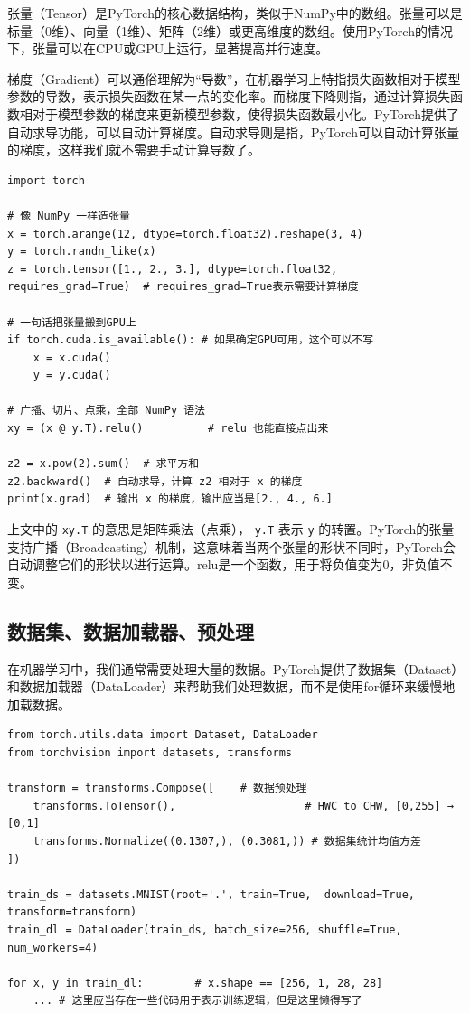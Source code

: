 张量（Tensor）是PyTorch的核心数据结构，类似于NumPy中的数组。张量可以是标量（0维）、向量（1维）、矩阵（2维）或更高维度的数组。使用PyTorch的情况下，张量可以在CPU或GPU上运行，显著提高并行速度。

梯度（Gradient）可以通俗理解为“导数”，在机器学习上特指损失函数相对于模型参数的导数，表示损失函数在某一点的变化率。而梯度下降则指，通过计算损失函数相对于模型参数的梯度来更新模型参数，使得损失函数最小化。PyTorch提供了自动求导功能，可以自动计算梯度。自动求导则是指，PyTorch可以自动计算张量的梯度，这样我们就不需要手动计算导数了。

\begin{verbatim}
import torch

# 像 NumPy 一样造张量
x = torch.arange(12, dtype=torch.float32).reshape(3, 4)
y = torch.randn_like(x)
z = torch.tensor([1., 2., 3.], dtype=torch.float32, requires_grad=True)  # requires_grad=True表示需要计算梯度

# 一句话把张量搬到GPU上
if torch.cuda.is_available(): # 如果确定GPU可用，这个可以不写
    x = x.cuda()
    y = y.cuda()

# 广播、切片、点乘，全部 NumPy 语法
xy = (x @ y.T).relu()          # relu 也能直接点出来

z2 = x.pow(2).sum()  # 求平方和
z2.backward()  # 自动求导，计算 z2 相对于 x 的梯度
print(x.grad)  # 输出 x 的梯度，输出应当是[2., 4., 6.]

\end{verbatim}

上文中的 \texttt{x\@ y.T} 的意思是矩阵乘法（点乘）， \texttt{y.T} 表示 \texttt{y} 的转置。PyTorch的张量支持广播（Broadcasting）机制，这意味着当两个张量的形状不同时，PyTorch会自动调整它们的形状以进行运算。relu是一个函数，用于将负值变为0，非负值不变。

\subsection{数据集、数据加载器、预处理}

在机器学习中，我们通常需要处理大量的数据。PyTorch提供了数据集（Dataset）和数据加载器（DataLoader）来帮助我们处理数据，而不是使用for循环来缓慢地加载数据。

\begin{verbatim}
from torch.utils.data import Dataset, DataLoader
from torchvision import datasets, transforms

transform = transforms.Compose([    # 数据预处理
    transforms.ToTensor(),                    # HWC to CHW, [0,255] → [0,1]
    transforms.Normalize((0.1307,), (0.3081,)) # 数据集统计均值方差
])

train_ds = datasets.MNIST(root='.', train=True,  download=True, transform=transform)
train_dl = DataLoader(train_ds, batch_size=256, shuffle=True, num_workers=4)

for x, y in train_dl:        # x.shape == [256, 1, 28, 28]
    ... # 这里应当存在一些代码用于表示训练逻辑，但是这里懒得写了
\end{verbatim}

